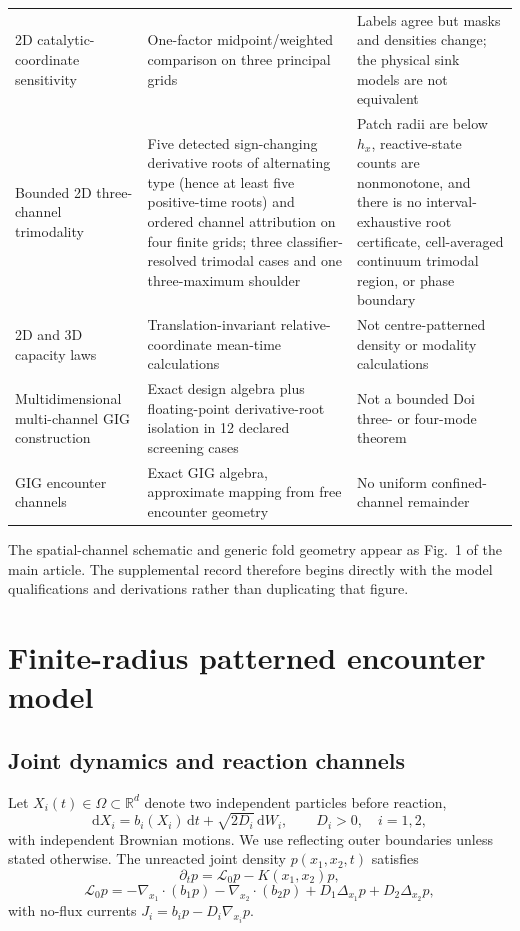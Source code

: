 \documentclass[aps,pre,reprint,amsmath,amssymb,longbibliography,floatfix]{revtex4-2}
\newcommand{\dd}{\mathrm d}
\newcommand{\Lfree}{\mathcal L_0}
\begin{document}
\begin{table}[!t]
\begin{ruledtabular}
\begin{tabular}{p{}p{}p{}}
2D catalytic-coordinate sensitivity
& One-factor midpoint/weighted comparison on three principal grids
& Labels agree but masks and densities change; the physical sink models are not equivalent\\
Bounded 2D three-channel trimodality
& Five detected sign-changing derivative roots of alternating type (hence at
least five positive-time roots) and ordered channel attribution on four finite
grids;
three classifier-resolved trimodal cases and one three-maximum shoulder
& Patch radii are below \(h_x\), reactive-state counts are nonmonotone, and
there is no interval-exhaustive root certificate, cell-averaged continuum
trimodal region, or phase boundary\\
2D and 3D capacity laws
& Translation-invariant relative-coordinate mean-time calculations
& Not centre-patterned density or modality calculations\\
Multidimensional multi-channel GIG construction
& Exact design algebra plus floating-point derivative-root isolation in 12
declared screening cases
& Not a bounded Doi three- or four-mode theorem\\
GIG encounter channels
& Exact GIG algebra, approximate mapping from free encounter geometry
& No uniform confined-channel remainder
\end{tabular}
\end{ruledtabular}
\end{table}

The spatial-channel schematic and generic fold geometry appear as Fig.~1 of
the main article. The supplemental record therefore begins directly with the
model qualifications and derivations rather than duplicating that figure.

\section{Finite-radius patterned encounter model}
\label{sec:model}

\subsection{Joint dynamics and reaction channels}
\label{sec:joint}

Let \(X_i(t)\in\Omega\subset\mathbb R^d\) denote two independent particles
before reaction,
\begin{equation}
\dd X_i=b_i(X_i)\,\dd t+\sqrt{2D_i}\,\dd W_i,
\qquad D_i>0,\quad i=1,2,
\label{eq:sde}
\end{equation}
with independent Brownian motions. We use reflecting outer boundaries unless
stated otherwise. The unreacted joint density \(p(x_1,x_2,t)\) satisfies
\begin{equation}
\partial_t p=\Lfree p-K(x_1,x_2)p,
\label{eq:joint-fp}
\end{equation}
\begin{equation}
\Lfree p=-\nabla_{x_1}\!\cdot(b_1p)
         -\nabla_{x_2}\!\cdot(b_2p)
         +D_1\Delta_{x_1}p+D_2\Delta_{x_2}p,
\label{eq:free-generator}
\end{equation}
with no-flux currents \(J_i=b_ip-D_i\nabla_{x_i}p\).
\end{document}
